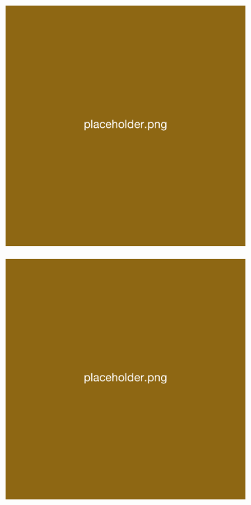 \begin{figure}[H]
\begin{subfigure}[b]{0.25\textwidth}
    \end{subfigure}
    \\\vspace{2pt}
    \begin{subfigure}[b]{0.25\textwidth}
        \includegraphics[width=\linewidth]{overleaf/images/placeholder.png}
    \end{subfigure}
    \begin{subfigure}[b]{0.25\textwidth}
        \includegraphics[width=\linewidth]{overleaf/images/placeholder.png}

\end{subfigure}
\end{figure}
